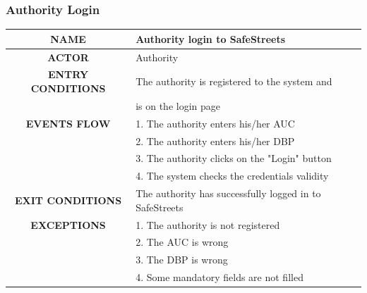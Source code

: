 \documentclass[12pt,a4paper]{article}
\begin{document}
\subsubsection{Authority Login}
\begin{center}
			\begin{tabular}{| c | l |}
				\hline
				\textbf{NAME} & Authority login to SafeStreets \\
				\hline
				\textbf{ACTOR} & Authority \\
				\hline
				\textbf{ENTRY CONDITIONS} & The authority is registered to the system and\\
				&	is on the login page \\
				\hline
				\textbf{EVENTS FLOW}  &
				1. The authority enters his/her AUC\\
				&2. The authority enters his/her DBP\\
				&3. The authority clicks on the "Login" button\\
				&4. The system checks the credentials validity\\
				\hline
				\textbf{EXIT CONDITIONS}  & The authority has successfully logged in to SafeStreets \\ 
				\hline
				\textbf{EXCEPTIONS} &
				1. The authority is not registered\\
				&2. The AUC is wrong\\
				&3. The DBP is wrong \\
				&4. Some mandatory fields are not filled\\
				\hline
			\end{tabular}
		\end{center}
\newpage
\end{document}
